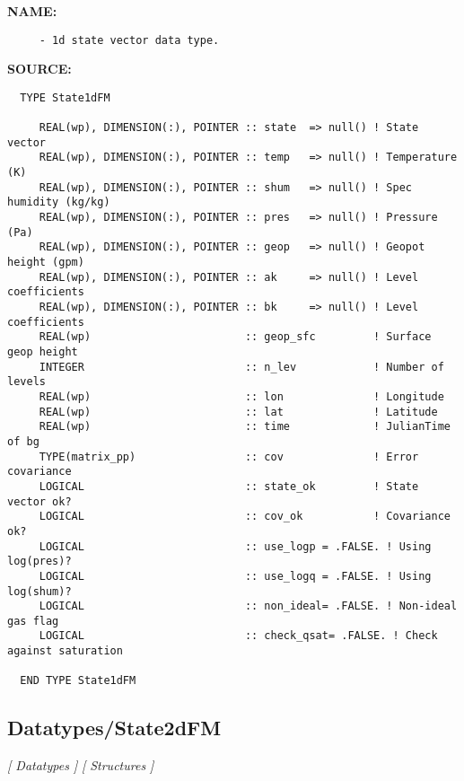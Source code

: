\label{ch:robo38}
\label{ch:Datatypes_State1dFM}
\textbf{NAME:}\hspace{0.08in}\begin{Verbatim}
     - 1d state vector data type.
\end{Verbatim}
\textbf{SOURCE:}\hspace{0.08in}\begin{Verbatim}
  TYPE State1dFM

     REAL(wp), DIMENSION(:), POINTER :: state  => null() ! State vector
     REAL(wp), DIMENSION(:), POINTER :: temp   => null() ! Temperature (K)
     REAL(wp), DIMENSION(:), POINTER :: shum   => null() ! Spec humidity (kg/kg)
     REAL(wp), DIMENSION(:), POINTER :: pres   => null() ! Pressure (Pa)
     REAL(wp), DIMENSION(:), POINTER :: geop   => null() ! Geopot height (gpm)
     REAL(wp), DIMENSION(:), POINTER :: ak     => null() ! Level coefficients
     REAL(wp), DIMENSION(:), POINTER :: bk     => null() ! Level coefficients
     REAL(wp)                        :: geop_sfc         ! Surface geop height
     INTEGER                         :: n_lev            ! Number of levels
     REAL(wp)                        :: lon              ! Longitude
     REAL(wp)                        :: lat              ! Latitude
     REAL(wp)                        :: time             ! JulianTime of bg
     TYPE(matrix_pp)                 :: cov              ! Error covariance
     LOGICAL                         :: state_ok         ! State vector ok?
     LOGICAL                         :: cov_ok           ! Covariance ok?
     LOGICAL                         :: use_logp = .FALSE. ! Using log(pres)?
     LOGICAL                         :: use_logq = .FALSE. ! Using log(shum)?
     LOGICAL                         :: non_ideal= .FALSE. ! Non-ideal gas flag
     LOGICAL                         :: check_qsat= .FALSE. ! Check against saturation

  END TYPE State1dFM
\end{Verbatim}
\subsection{Datatypes/State2dFM}
\textsl{[ Datatypes ]}
\textsl{[ Structures ]}

